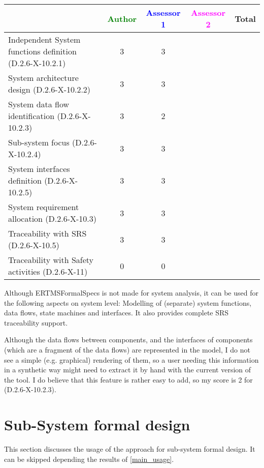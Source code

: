 \begin{tabular}{|l | c | c | c | c|}
\hline
& \textcolor{green}{Author} & \textcolor{blue}{Assessor 1} & \textcolor{magenta}{Assessor 2} & Total \\
\hline
Independent System functions definition (D.2.6-X-10.2.1)  & 3 & 3 & &  \\
\hline 
System architecture design (D.2.6-X-10.2.2) & 3 & 3 & &  \\
\hline
System data flow identification (D.2.6-X-10.2.3)  & 3 & 2 & &  \\
\hline
Sub-system focus (D.2.6-X-10.2.4)  & 3 & 3 & &  \\
\hline
System interfaces definition (D.2.6-X-10.2.5)  & 3 & 3 & &  \\
\hline
System requirement allocation (D.2.6-X-10.3)  & 3 & 3 & &  \\
\hline
Traceability with SRS (D.2.6-X-10.5)  & 3 & 3 & &  \\
\hline
Traceability with Safety activities (D.2.6-X-11)  & 0 & 0 & &  \\
\hline
\end{tabular}

\begin{author_comment}
Although ERTMSFormalSpecs is not made for system analysis, it can be used for the following aspects on system level: Modelling of (separate) system functions, data flows, state machines and interfaces. It also provides complete SRS traceability support.  
\end{author_comment}

\begin{assessor1}
Although the data flows between components, and the interfaces of components (which are a fragment of the data flows) are represented in the model, I do not see a simple (e.g. graphical) rendering of them, so a user needing this information in a synthetic way might need to extract it by hand with the current version of the tool. I do believe that this feature is rather easy to add, so my score is 2 for (D.2.6-X-10.2.3). 
\end{assessor1}

\section{Sub-System formal design}
This section discusses the usage of the approach for sub-system formal design.
It can be skipped depending the results of \ref{main_usage}.

